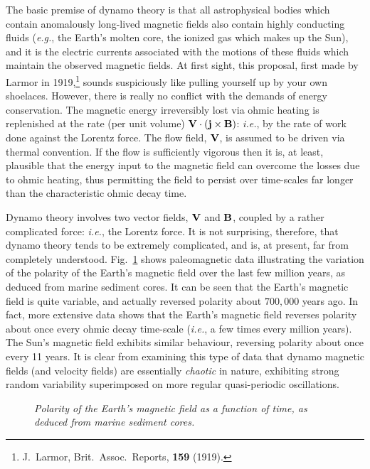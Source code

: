 The basic premise of dynamo theory is that all astrophysical bodies which
contain anomalously long-lived magnetic fields also contain  highly conducting
fluids ({\em e.g.}, the Earth's molten core, the ionized gas which makes
up the Sun), and it is the electric currents
associated with the motions of these fluids which maintain the
observed magnetic fields. At first sight, this proposal, first
made by Larmor in 1919,\footnote{J.~Larmor, Brit.\ Assoc.\ Reports, {\bf 159}
(1919).} sounds suspiciously like
pulling yourself up by your own shoelaces. However, there is really
no conflict with the demands of energy conservation. The 
magnetic  energy irreversibly
lost via ohmic heating is replenished at the rate
(per unit volume) ${\bf V}\cdot
({\bf j}\times{\bf B})$: {\em i.e.}, by the rate of work done against the
Lorentz force. The flow  field, ${\bf V}$, is assumed to be driven via thermal
convention. If the flow is sufficiently vigorous then it is, at least,
plausible that the energy input to the magnetic field can overcome the losses
due to ohmic heating, thus permitting the field to persist over time-scales
far longer than the characteristic ohmic decay time.

Dynamo theory  involves two vector fields, 
${\bf V}$ and ${\bf B}$, coupled by a rather complicated force: {\em i.e.},
the Lorentz force. 
It is not surprising, therefore, that dynamo theory tends to be extremely
complicated, and is, at present,  far from completely understood. 
Fig.~\ref{f23} shows paleomagnetic data illustrating  the variation of the polarity of the Earth's
magnetic field over the last few  million years, as
deduced from marine sediment cores. It can be seen that the Earth's magnetic
field is quite variable, and actually reversed polarity about $700,000$ years
ago. In fact, more extensive data shows that the Earth's magnetic field
reverses polarity about once every ohmic decay time-scale ({\em i.e.}, a few
times every million years). The Sun's magnetic field exhibits similar
behaviour, reversing polarity about once every 11 years. It is clear from
examining this type of data that dynamo magnetic fields (and velocity fields) are 
essentially {\em chaotic}\/
in nature, 
exhibiting strong random variability superimposed on more regular quasi-periodic
oscillations.

\begin{figure}
\epsfysize=5in
\centerline{}
\caption{\em Polarity of the Earth's magnetic field as a function of time, as deduced from
marine sediment cores.}\label{f23}
\end{figure}

